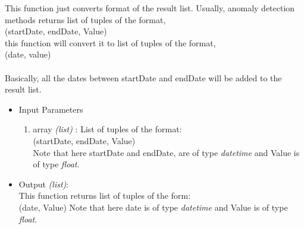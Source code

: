 \begin{itemize}
 
 This function just converts format of the result list. Usually, anomaly 
detection methods returns list of tuples of the format, \\ 
 (startDate, endDate, Value) \\
 this function will convert it to list of tuples of the format, \\
 (date, value) \\
 \\
 Basically, all the dates between startDate and endDate will be added to the 
result list.
 
 \begin{itemize}
 \item Input Parameters
 
 \begin{enumerate}
  \item array \textit{(list)} : List of tuples of the format: \\
  (startDate, endDate, Value) \\
  Note that here startDate and endDate, are of type \textit{datetime} and Value 
is of type \textit{float}.
 \end{enumerate}

 \item Output \textit{(list)}: \\
 This function returns list of tuples of the form: \\
 (date, Value)
  Note that here date is of type \textit{datetime} and Value is of type 
\textit{float}.
 \end{itemize}
 
 
 
 
 
 
 
 
 
 
 
 
 
 
 
 
 
 
 
\end{itemize}


